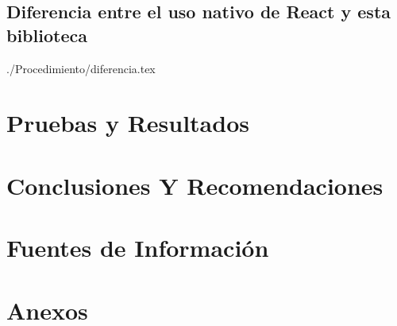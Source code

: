 \documentclass[a4paper,12pt, listof=totoc]{report}
\begin{document}
			\section {Diferencia entre el uso nativo de React y esta biblioteca}
				 {./Procedimiento/diferencia.tex}
			
		
		\chapter {Pruebas y Resultados}
			
		
		\chapter {Conclusiones Y Recomendaciones}
			
		
		\chapter {Fuentes de Información}
			
			
		\chapter {Anexos}
		

\end{document}
